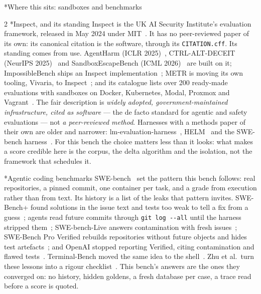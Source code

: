 \documentclass[10pt,a4paper]{article}
\makeatletter
\renewcommand\section{\@startsection{section}{1}{0pt}{0pt}{6pt}%
  {\display\bfseries\Large\color{ink}}}
\renewcommand\subsection{\@startsection{subsection}{2}{0pt}{8pt}{2pt}%
  {\display\bfseries\normalsize\color{ink}}}
\makeatother
\begin{document}
\section*{Where this sits: sandboxes and benchmarks}
\begin{multicols}{2}
\subsection*{Inspect, and its standing}
Inspect is the UK AI Security Institute's evaluation framework, released
in May 2024 under MIT~\cite{inspect}. It has no peer-reviewed paper of
its own: its canonical citation is the software, through its
\texttt{CITATION.cff}. Its standing comes from use. AgentHarm (ICLR
2025)~\cite{agentharm}, CTRL-ALT-DECEIT (NeurIPS 2025)~\cite{ctrlaltdeceit}
and SandboxEscapeBench (ICML 2026)~\cite{sandboxescape} are built on it;
ImpossibleBench ships an Inspect implementation~\cite{impossiblebench};
METR is moving its own tooling, Vivaria, to Inspect~\cite{vivaria}; and
its catalogue lists over 200 ready-made evaluations with sandboxes on
Docker, Kubernetes, Modal, Proxmox and Vagrant~\cite{inspect,
aisisandbox}. The fair description is \emph{widely adopted,
government-maintained infrastructure, cited as software} — the de facto
standard for agentic and safety evaluations — not \emph{a peer-reviewed
method}. Harnesses with a methods paper of their own are older and
narrower: lm-evaluation-harness~\cite{lmeval}, HELM~\cite{helm} and the
SWE-bench harness~\cite{swebench}. For this bench the choice matters
less than it looks: what makes a score credible here is the corpus, the
delta algorithm and the isolation, not the framework that schedules it.

\subsection*{Agentic coding benchmarks}
SWE-bench~\cite{swebench} set the pattern this bench follows: real
repositories, a pinned commit, one container per task, and a grade from
execution rather than from text. Its history is a list of the leaks that
pattern invites. SWE-Bench+ found solutions in the issue text and tests
too weak to tell a fix from a guess~\cite{swebenchplus}; agents read
future commits through \texttt{git log -{}-all} until the harness stripped
them~\cite{swebench465}; SWE-bench-Live answers contamination with fresh
issues~\cite{swebenchlive}; SWE-Bench Pro Verified rebuilds repositories
without future objects and hides test artefacts~\cite{sweprover}; and
OpenAI stopped reporting Verified, citing contamination and flawed
tests~\cite{openaiverified}. Terminal-Bench moved the same idea to the
shell~\cite{terminalbench}. Zhu et al.\ turn these lessons into a rigour
checklist~\cite{rigorous}. This bench's answers are the ones they
converged on: no history, hidden goldens, a fresh database per case, a
trace read before a score is quoted.


\end{multicols}
\end{document}
